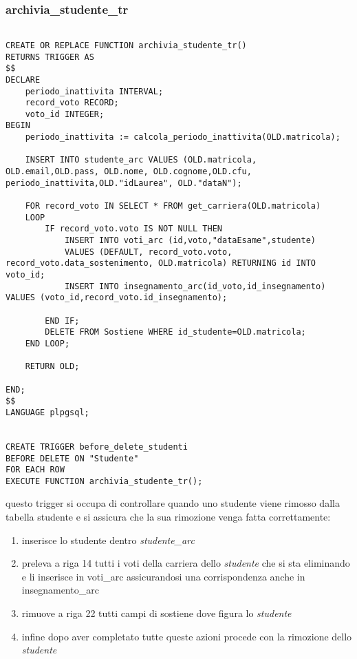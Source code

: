 \subsubsection{archivia\_studente\_tr}\label{archiviaStudenteTr}
\begin{lstlisting}[style=sqlStyle]

CREATE OR REPLACE FUNCTION archivia_studente_tr()
RETURNS TRIGGER AS
$$
DECLARE
    periodo_inattivita INTERVAL;
    record_voto RECORD;
    voto_id INTEGER;
BEGIN
    periodo_inattivita := calcola_periodo_inattivita(OLD.matricola);
    
    INSERT INTO studente_arc VALUES (OLD.matricola, OLD.email,OLD.pass, OLD.nome, OLD.cognome,OLD.cfu, periodo_inattivita,OLD."idLaurea", OLD."dataN");

    FOR record_voto IN SELECT * FROM get_carriera(OLD.matricola)
    LOOP
        IF record_voto.voto IS NOT NULL THEN
            INSERT INTO voti_arc (id,voto,"dataEsame",studente)
            VALUES (DEFAULT, record_voto.voto, record_voto.data_sostenimento, OLD.matricola) RETURNING id INTO voto_id;
            INSERT INTO insegnamento_arc(id_voto,id_insegnamento) VALUES (voto_id,record_voto.id_insegnamento);
            
        END IF;
        DELETE FROM Sostiene WHERE id_studente=OLD.matricola;
    END LOOP;
    
    RETURN OLD;

END;
$$
LANGUAGE plpgsql;


CREATE TRIGGER before_delete_studenti
BEFORE DELETE ON "Studente"
FOR EACH ROW
EXECUTE FUNCTION archivia_studente_tr();
\end{lstlisting}
questo trigger si occupa di controllare quando uno  studente viene rimosso dalla tabella studente e si assicura che la sua rimozione venga fatta correttamente: 
\begin{enumerate}
    \item inserisce lo studente dentro  \textit{studente\_arc}
    \item preleva a riga 14 tutti i voti della carriera dello \textit{studente} che si sta eliminando e li inserisce in voti\_arc assicurandosi una corrispondenza anche in insegnamento\_arc
    \item rimuove a riga 22 tutti campi di sostiene dove figura lo \textit{studente}
    \item infine dopo aver completato tutte queste azioni procede con la rimozione dello \textit{studente}
\end{enumerate}
